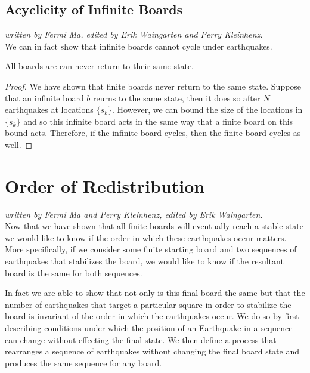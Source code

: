 \documentclass[runningheads,a4paper]{llncs}
\begin{document}
\subsection{Acyclicity of Infinite Boards}
\label{Acyclicity of Infinite Boards}
\emph{written by Fermi Ma, edited by Erik Waingarten and Perry Kleinhenz.}\\

We can in fact show that infinite boards cannot cycle under earthquakes. 

\begin{corollary}
All boards are can never return to their same state.
\end{corollary}

\begin{proof}
We have shown that finite boards never return to the same state. Suppose that an infinite board $b$ reurns to the same state, then it does so after $N$ earthquakes at locations $\{ s_k \}$. However, we can bound the size of the locations in $\{ s_k \}$ and so this infinite board acts in the same way that a finite board on this bound acts. Therefore, if the infinite board cycles, then the finite board cycles as well. 
\end{proof}

\section{Order of Redistribution}
\label{Order of Redistribution}

\emph{written by Fermi Ma and Perry Kleinhenz, edited by Erik Waingarten.}\\

Now that we have shown that all finite boards will eventually reach a stable state we would like to know if the order in which these earthquakes occur matters. More specifically, if we consider some finite starting board and two sequences of earthquakes that stabilizes the board, we would like to know if the resultant board is the same for both sequences. 

In fact we are able to show that not only is this final board the same but that the number of earthquakes that target a particular square in order to stabilize the board is invariant of the order in which the earthquakes occur. We do so by first describing conditions under which the position of an Earthquake in a sequence can change without effecting the final state. We then define a process that rearranges a sequence of earthquakes without changing the final board state and produces the same sequence for any board.\\
\end{document}
